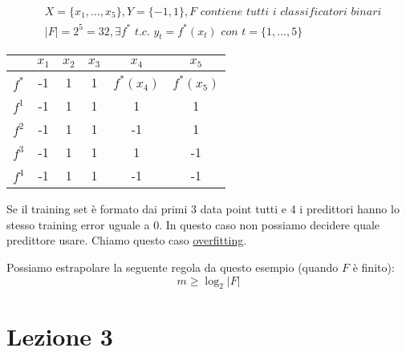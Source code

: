 \documentclass{article}
\begin{document}
\begin{displaymath}
	\begin{split}
		&X= \{ x_1,\dots, x_5 \}, Y= \{ -1,1 \}, F \textit{ contiene tutti i classificatori binari} \\
		&|F|=2^5=32, \exists f^* \textit{ t.c. } y_t=f^*(x_t) \textit{ con } t=\{ 1,\dots, 5 \}
	\end{split}
\end{displaymath}
\begin{table}[]
\begin{tabular}{l|ccccc}
\cline{2-6}
                            & \multicolumn{1}{c|}{$x_1$} & \multicolumn{1}{c|}{$x_2$} & \multicolumn{1}{c|}{$x_3$} & \multicolumn{1}{c|}{$x_4$} & \multicolumn{1}{c|}{$x_5$} \\ \hline
\multicolumn{1}{|l|}{$f^*$} & -1                         & 1                          & 1                          & $f^*(x_4)$                 & $f^*(x_5)$                 \\ \cline{1-1}
\multicolumn{1}{|l|}{$f^1$} & -1                         & 1                          & 1                          & 1                          & 1                          \\ \cline{1-1}
\multicolumn{1}{|l|}{$f^2$} & -1                         & 1                          & 1                          & -1                         & 1                          \\ \cline{1-1}
\multicolumn{1}{|l|}{$f^3$} & -1                         & 1                          & 1                          & 1                          & -1                         \\ \cline{1-1}
\multicolumn{1}{|l|}{$f^4$} & -1                         & 1                          & 1                          & -1                         & -1                         \\ \cline{1-1}
\end{tabular}
\end{table}
Se il training set è formato dai primi 3 data point tutti e 4 i predittori hanno lo stesso training error uguale a 0. In questo caso non possiamo decidere quale predittore usare. Chiamo questo caso \underline{overfitting}.



Possiamo estrapolare la seguente regola da questo esempio (quando $F$ è finito):
\begin{displaymath}
	m \geq \log_2|F|
\end{displaymath}

\section{Lezione 3}
\end{document}
